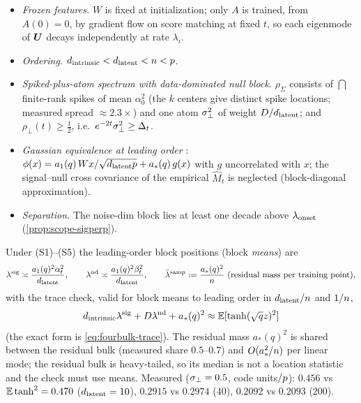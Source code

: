 \begin{assumption}\label{asm:scope-standing}
\begin{itemize}
\item[(S1)] \emph{Frozen features.} $W$ is fixed at initialization; only $A$ is trained, from $A(0)=0$, by gradient flow on score matching at fixed $t$, so each eigenmode of $\bm{U}$ decays independently at rate $\lambda_i$.
\item[(S2)] \emph{Ordering.} $d_{\mathrm{intrinsic}}<d_{\mathrm{latent}}<n<p$.
\item[(S3)] \emph{Spiked-plus-atom spectrum with data-dominated null block.} $\rho_\Sigma$ consists of $\dint$ finite-rank spikes of mean $\alpha_0^2$ (the $k$ centers give distinct spike locations; measured spread $\approx2.3\times$) and one atom $\sigma_{\perp}^2$ of weight $D/d_{\mathrm{latent}}$; and $\rho_\perp(t)\ge\tfrac12$, i.e.\ $e^{-2t}\sigma_{\perp}^2\ge\Delta_t$.
\item[(S4)] \emph{Gaussian equivalence at leading order} \citep{goldt2022gaussian,hu2022universality}: $\phi(x)=a_1(q)\,Wx/\sqrt{d_{\mathrm{latent}}p}+a_*(q)\,g(x)$ with $g$ uncorrelated with $x$; the signal--null cross covariance of the empirical $\hat M_t$ is neglected (block-diagonal approximation).
\item[(S5)] \emph{Separation.} The noise-dim block lies at least one decade above $\lambda_{\rm onset}$ (\cref{prop:scope-sigperp}).
\end{itemize}
Under (S1)--(S5) the leading-order block positions (block \emph{means}) are
\begin{equation}\label{eq:scope-edges}
\lambda^{\rm sig}\asymp\frac{a_1(q)^2\alpha_t^2}{d_{\mathrm{latent}}},\qquad
\lambda^{\rm nd}\asymp\frac{a_1(q)^2\beta_t^2}{d_{\mathrm{latent}}},\qquad
\bar\lambda^{\rm samp}:=\frac{a_*(q)^2}{n}\ \text{(residual mass per training point)},
\end{equation}
with the trace check, valid for block means to leading order in $d_{\mathrm{latent}}/n$ and $1/n$,
\begin{equation}\label{eq:scope-trace}
d_{\mathrm{intrinsic}}\lambda^{\rm sig}+D\lambda^{\rm nd}+a_*(q)^2\approx\mathbb{E}[\tanh(\sqrt q z)^2]
\end{equation}
(the exact form is \eqref{eq:fourbulk-trace}). The residual mass $a_*(q)^2$ is shared between the residual bulk (measured share $0.5$--$0.7$) and $O(a_*^2/n)$ per linear mode; the residual bulk is heavy-tailed, so its median is not a location statistic and the check must use means. Measured ($\sigma_{\perp}=0.5$, code units$/p$): $0.456$ vs $\mathbb{E}\tanh^2=0.470$ ($d_{\mathrm{latent}}=10$), $0.2915$ vs $0.2974$ ($40$), $0.2092$ vs $0.2093$ ($200$).
\end{assumption}

